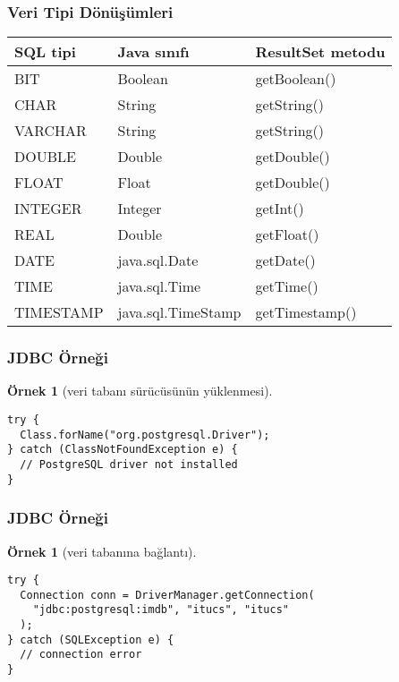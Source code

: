 \documentclass[dvipsnames]{beamer}
\theoremstyle{definition}
\theoremstyle{example}
\newtheorem{ornek}[theorem]{Örnek}
\theoremstyle{plain}
\begin{document}
\begin{frame}
  \frametitle{Veri Tipi Dönüşümleri}

  \begin{table}
    \begin{tabular}{|l|l|l|}\hline
SQL tipi  & Java sınıfı        & ResultSet metodu\\\hline\hline
BIT       & Boolean            & getBoolean()    \\\hline
CHAR      & String             & getString()     \\\hline
VARCHAR   & String             & getString()     \\\hline
DOUBLE    & Double             & getDouble()     \\\hline
FLOAT     & Float              & getDouble()     \\\hline
INTEGER   & Integer            & getInt()        \\\hline
REAL      & Double             & getFloat()      \\\hline
DATE      & java.sql.Date      & getDate()       \\\hline
TIME      & java.sql.Time      & getTime()       \\\hline
TIMESTAMP & java.sql.TimeStamp & getTimestamp()  \\\hline
    \end{tabular}
  \end{table}
\end{frame}

\begin{frame}[fragile]
  \frametitle{JDBC Örneği}

  \begin{ornek}[veri tabanı sürücüsünün yüklenmesi]
    \begin{lstlisting}
try {
  Class.forName("org.postgresql.Driver");
} catch (ClassNotFoundException e) {
  // PostgreSQL driver not installed
}
    \end{lstlisting}
  \end{ornek}
\end{frame}

\begin{frame}[fragile]
  \frametitle{JDBC Örneği}

  \begin{ornek}[veri tabanına bağlantı]
    \begin{lstlisting}
try {
  Connection conn = DriverManager.getConnection(
    "jdbc:postgresql:imdb", "itucs", "itucs"
  );
} catch (SQLException e) {
  // connection error
}
    \end{lstlisting}
  \end{ornek}
\end{frame}
\end{document}
